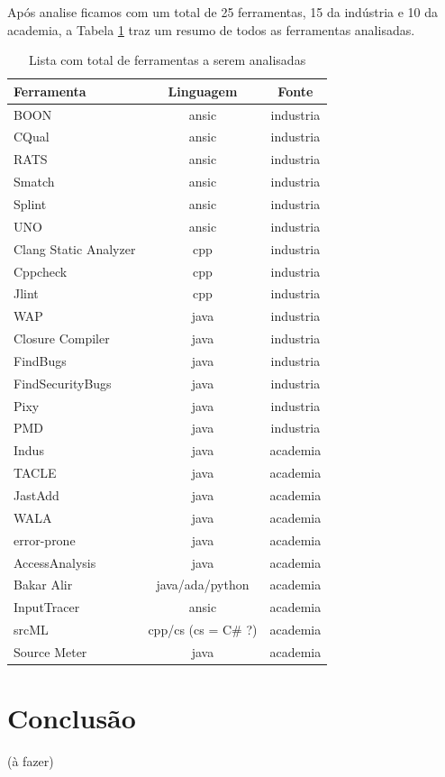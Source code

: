 \documentclass[qual, classic, a4paper]{ufbathesis}
\begin{document}

Após analise ficamos com um total de 25 ferramentas, 15 da indústria e 10 da
academia, a Tabela \ref{total-de-ferramentas} traz um resumo de todos as
ferramentas analisadas.

\begin{table}
\caption{Lista com total de ferramentas a serem analisadas}
\centering
\begin{tabular}{| l | c | c |}
\hline
Ferramenta & Linguagem & Fonte \\
\hline
BOON                  & ansic                & industria \\
CQual                 & ansic                & industria \\
RATS                  & ansic                & industria \\
Smatch                & ansic                & industria \\
Splint                & ansic                & industria \\
UNO                   & ansic                & industria \\
Clang Static Analyzer & cpp                  & industria \\
Cppcheck              & cpp                  & industria \\
Jlint                 & cpp                  & industria \\
WAP                   & java                 & industria \\
Closure Compiler      & java                 & industria \\
FindBugs              & java                 & industria \\
FindSecurityBugs      & java                 & industria \\
Pixy                  & java                 & industria \\
PMD                   & java                 & industria \\
Indus                 & java                 & academia  \\
TACLE                 & java                 & academia  \\
JastAdd               & java                 & academia  \\
WALA                  & java                 & academia  \\
error-prone           & java                 & academia  \\
AccessAnalysis        & java                 & academia  \\
Bakar Alir            & java/ada/python      & academia  \\
InputTracer           & ansic                & academia  \\
srcML                 & cpp/cs (cs = C\# ?)   & academia  \\
Source Meter          & java                 & academia  \\
\hline
\end{tabular}
\label{total-de-ferramentas}
\end{table}

\chapter{Conclusão}

(à fazer)

\backmatter
\appendix

\end{document}
